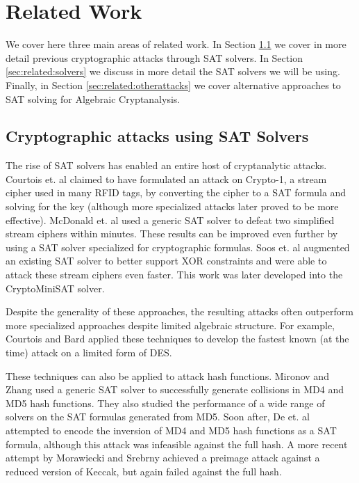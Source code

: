 \section{Related Work}
\label{sec:related}
We cover here three main areas of related work. In Section \ref{sec:related:satattacks} we cover in more detail previous cryptographic attacks through SAT solvers. In Section \ref{sec:related:solvers} we discuss in more detail the SAT solvers we will be using. Finally, in Section \ref{sec:related:otherattacks} we cover alternative approaches to SAT solving for Algebraic Cryptanalysis. 

\subsection{Cryptographic attacks using SAT Solvers}
\label{sec:related:satattacks}
The rise of SAT solvers has enabled an entire host of cryptanalytic attacks. Courtois et. al \cite{CNO08} claimed to have formulated an attack on Crypto-1, a stream cipher used in many RFID tags, by converting the cipher to a SAT formula and solving for the key (although more specialized attacks \cite{GGMRVSJ08} later proved to be more effective). McDonald et. al \cite{MCP07} used a generic SAT solver to defeat two simplified stream ciphers within minutes. These results can be improved even further by using a SAT solver specialized for cryptographic formulas. Soos et. al \cite{SNC09} augmented an existing SAT solver to better support XOR constraints and were able to attack these stream ciphers even faster. This work was later developed into the {CryptoMiniSAT} solver.

Despite the generality of these approaches, the resulting attacks often outperform more specialized approaches despite limited algebraic structure. For example, Courtois and Bard \cite{CB07} applied these techniques to develop the fastest known (at the time) attack on a limited form of DES.

These techniques can also be applied to attack hash functions. Mironov and Zhang \cite{MZ06} used a generic SAT solver to successfully generate collisions in MD4 and MD5 hash functions. They also studied the performance of a wide range of solvers on the SAT formulas generated from MD5. Soon after, De et. al \cite{DKV07} attempted to encode the inversion of MD4 and MD5 hash functions as a SAT formula, although this attack was infeasible against the full hash. A more recent attempt by Morawiecki and Srebrny \cite{MS13} achieved a preimage attack against a reduced version of Keccak, but again failed against the full hash.

